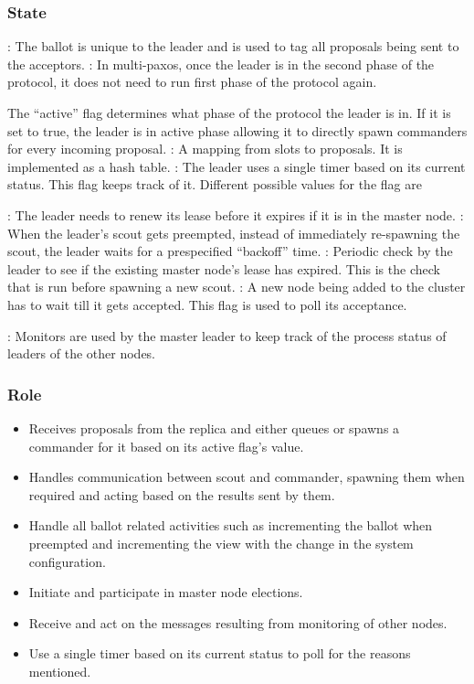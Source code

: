 \subsubsection{State}

\begin{itemize}
    : The ballot is unique to the leader and is used to tag all
    proposals being sent to the acceptors.
    : In multi-paxos, once the leader is in the second phase of
    the protocol, it does not need to run first phase of the protocol again.

    The ``active'' flag determines what phase of the protocol the leader is in.
    If it is set to true, the leader is in active phase allowing it to directly
    spawn commanders for every incoming proposal.
    : A mapping from slots to proposals. It is implemented as
    a hash table.
    : The leader uses a single timer based on its current
    status. This flag keeps track of it. Different possible values for the flag
    are
    \begin{itemize}
        : The leader needs to renew its lease before it expires if
        it is in the master node.
        : When the leader's scout gets preempted, instead of
        immediately re-spawning the scout, the leader waits for a prespecified
        ``backoff'' time.
        : Periodic check by the leader to see if the
        existing master node's lease has expired. This is the check that is run
        before spawning a new scout.
        : A new node being added to the cluster has to wait
        till it gets accepted. This flag is used to poll its acceptance.
    \end{itemize}
    : Monitors are used by the master leader to keep track of
    the process status of leaders of the other nodes.
\end{itemize}

\subsubsection{Role}

\begin{itemize}
  \item Receives proposals from the replica and either queues or spawns a
    commander for it based on its active flag's value.
  \item Handles communication between scout and commander, spawning them
    when required and acting based on the results sent by them.
  \item Handle all ballot related activities such as incrementing the ballot
    when preempted and incrementing the view with the change in the system
    configuration.
  \item Initiate and participate in master node elections.
  \item Receive and act on the messages resulting from monitoring of other
    nodes.
  \item Use a single timer based on its current status to poll for the
    reasons mentioned.
\end{itemize}

